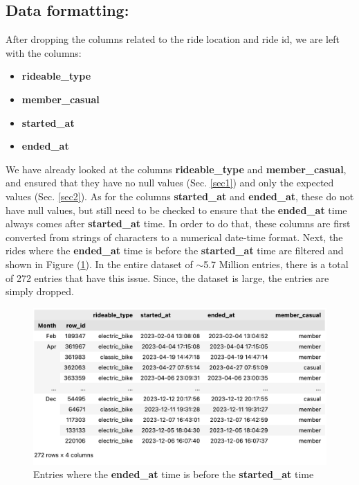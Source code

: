 \documentclass[12pt]{article}
\begin{document}
\subsection{Data formatting:}
After dropping the columns related to the ride location and ride id, we are left with the columns:
\begin{itemize}
	\item \textbf{rideable\_type}
	\item \textbf{member\_casual}
	\item \textbf{started\_at}
	\item \textbf{ended\_at}
\end{itemize}
We have already looked at the columns \textbf{rideable\_type} and \textbf{member\_casual}, and ensured that they have no null values (Sec. \underline{\ref{sec1}}) and only the expected values (Sec. \underline{\ref{sec2}}). As for the columns \textbf{started\_at} and \textbf{ended\_at}, these do not have null values, but still need to be checked to ensure that the \textbf{ended\_at} time always comes after \textbf{started\_at} time. In order to do that, these columns are first converted from strings of characters to a numerical date-time format. Next, the rides where the \textbf{ended\_at} time is before the \textbf{started\_at} time are filtered and shown in Figure (\underline{\ref{fig8}}). In the entire dataset of $\sim$5.7 Million entries, there is a total of 272 entries that have this issue. Since, the dataset is large, the entries are simply dropped. \\

	\begin{figure}[h]
	\centering
	\includegraphics[scale=0.5]{same_started_at.png}
	\caption{Entries where the \textbf{ended\_at} time is before the \textbf{started\_at} time}
	\label{fig8}
	\end{figure}
	
\end{document}
